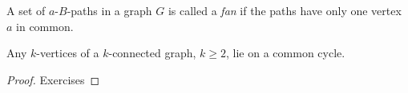 \documentclass[aagt.tex]{subfiles}
\begin{document}
\begin{defi*}
  A set of $a$-$B$-paths in a graph $G$ is called a \emph{fan} if the paths have only one vertex $a$ in common.  
\end{defi*}

\begin{theorem}[Dirac 1960] \label{2_2}
  Any $k$-vertices of a $k$-connected graph, $k \geq 2$, lie on a common cycle.
\end{theorem}

\begin{proof}
  Exercises
\end{proof}
\end{document}
